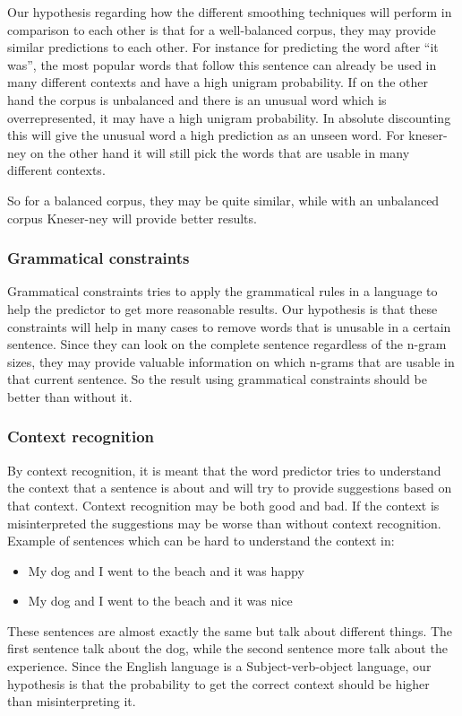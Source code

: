 Our hypothesis regarding how the different smoothing techniques will perform in comparison to each other is that for a well-balanced corpus, they may provide similar predictions to each other. For instance for predicting the word after “it was”, the most popular words that follow this sentence can already be used in many different contexts and have a high unigram probability. If on the other hand the corpus is unbalanced and there is an unusual word which is overrepresented, it may have a high unigram probability. In absolute discounting this will give the unusual word a high prediction as an unseen word. For kneser-ney on the other hand it will still pick the words that are usable in many different contexts.

So for a balanced corpus, they may be quite similar, while with an unbalanced corpus Kneser-ney will provide better results.
\subsubsection{Grammatical constraints}
Grammatical constraints tries to apply the grammatical rules in a language to help the predictor to get more reasonable results. Our hypothesis is that these constraints will help in many cases to remove words that is unusable in a certain sentence. Since they can look on the complete sentence regardless of the n-gram sizes, they may provide valuable information on which n-grams that are usable in that current sentence. So the result using grammatical constraints should be better than without it.
\subsubsection{Context recognition}
By context recognition, it is meant that the word predictor tries to understand the context that a sentence is about and will try to provide suggestions based on that context. Context recognition may be both good and bad. If the context is misinterpreted the suggestions may be worse than without context recognition. Example of sentences which can be hard to understand the context in:

\begin{itemize}
\item My dog and I went to the beach and it was happy
\item My dog and I went to the beach and it was nice
\end{itemize}
These sentences are almost exactly the same but talk about different things. The first sentence talk about the dog, while the second sentence more talk about the experience.
Since the English language is a Subject-verb-object language, our hypothesis is that the probability to get the correct context should be higher than misinterpreting it.

